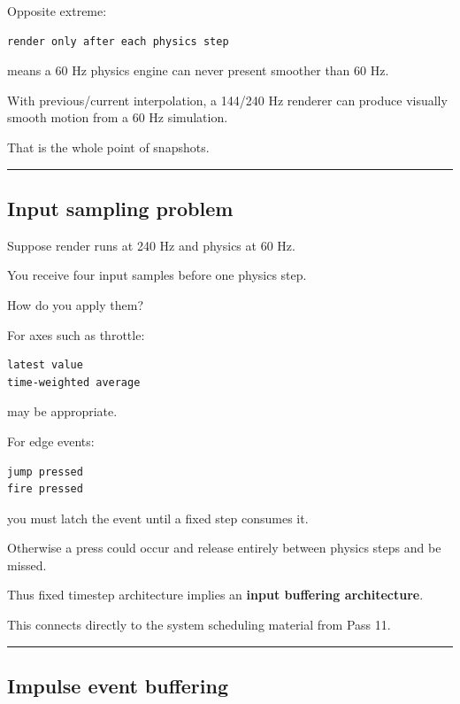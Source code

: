 Opposite extreme:

\begin{verbatim}
render only after each physics step
\end{verbatim}

means a 60 Hz physics engine can never present smoother than 60 Hz.

With previous/current interpolation, a 144/240 Hz renderer can produce visually smooth motion from a 60 Hz simulation.

That is the whole point of snapshots.

\begin{center}\rule{0.5\linewidth}{0.5pt}\end{center}

\subsection{Input sampling problem}\label{06-engine-ii-ch038-input-sampling-problem}

Suppose render runs at 240 Hz and physics at 60 Hz.

You receive four input samples before one physics step.

How do you apply them?

For axes such as throttle:

\begin{verbatim}
latest value
time-weighted average
\end{verbatim}

may be appropriate.

For edge events:

\begin{verbatim}
jump pressed
fire pressed
\end{verbatim}

you must latch the event until a fixed step consumes it.

Otherwise a press could occur and release entirely between physics steps and be missed.

Thus fixed timestep architecture implies an \textbf{input buffering architecture}.

This connects directly to the system scheduling material from Pass 11.

\begin{center}\rule{0.5\linewidth}{0.5pt}\end{center}

\subsection{Impulse event buffering}\label{06-engine-ii-ch038-impulse-event-buffering}

